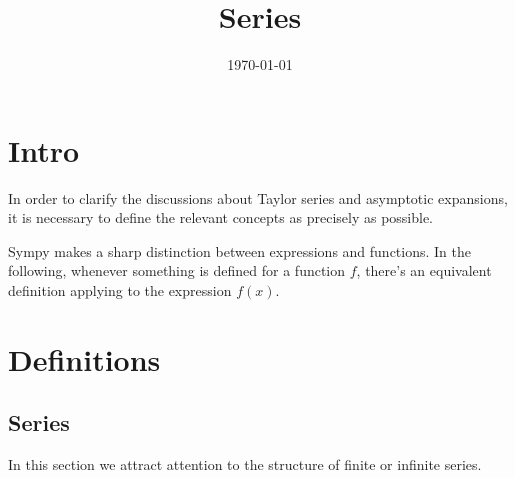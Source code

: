 \documentclass[a4paper]{article}
\title{Series}
\author{}
\date{\today}
\begin{document}
\tableofcontents

\section{Intro}
In order to clarify the discussions about Taylor series and asymptotic expansions, it is necessary to define the relevant concepts as precisely as possible.

Sympy makes a sharp distinction between expressions and functions. In the following, whenever something is defined for a function \(f\), there's an equivalent definition applying to the expression \(f(x)\).

\section{Definitions}

   \subsection{Series}
   
   In this section we attract attention to the structure of finite or infinite series.
    
\end{document}
